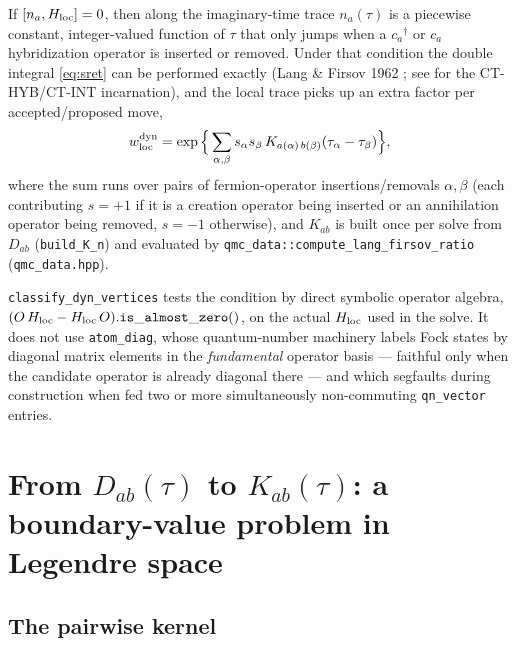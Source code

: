 \documentclass[a4paper,12pt]{article}
\renewcommand{\t}{\ensuremath{\tau}}
\newcommand{\Hloc}{\ensuremath{H_{\rm loc}}}
\newcommand{\ndag}{\ensuremath{^\dagger}}
\begin{document}
If $[n_a,\Hloc]=0$, then along the imaginary-time trace $n_a(\t)$ is a piecewise
constant, integer-valued function of $\t$ that only jumps when a $c_a\ndag$ or $c_a$
hybridization operator is inserted or removed. Under that condition the double
integral \eqref{eq:sret} can be performed exactly (Lang \& Firsov 1962
\cite{LangFirsov1962}; see \cite{WernerMillis2007,WernerMillis2010,GullRMP2011} for the
CT-HYB/CT-INT incarnation), and the local trace picks up an extra factor
per accepted/proposed move,
\begin{equation}
  w^{\rm dyn}_{\rm loc} = \exp\Big\{ \sum_{\alpha,\beta} s_\alpha s_\beta\,
  K_{a(\alpha)\,b(\beta)}(\t_\alpha-\t_\beta) \Big\},
  \label{eq:ratio}
\end{equation}
where the sum runs over pairs of fermion-operator insertions/removals $\alpha,\beta$
(each contributing $s=+1$ if it is a creation operator being inserted or an
annihilation operator being removed, $s=-1$ otherwise), and $K_{ab}$ is built once per
solve from $D_{ab}$ (\texttt{build\_K\_n}) and evaluated by
\texttt{qmc\_data::compute\_lang\_firsov\_ratio} (\texttt{qmc\_data.hpp}).

\texttt{classify\_dyn\_vertices} tests the condition by direct symbolic operator algebra,
$(O\,\Hloc-\Hloc\,O).\mathtt{is\_almost\_zero()}$, on the actual $\Hloc$ used in the
solve. It does not use \texttt{atom\_diag}, whose quantum-number machinery labels Fock
states by diagonal matrix elements in the \emph{fundamental} operator basis --- faithful
only when the candidate operator is already diagonal there --- and which segfaults during
construction when fed two or more simultaneously non-commuting \texttt{qn\_vector}
entries.

\section{From $D_{ab}(\t)$ to $K_{ab}(\t)$: a boundary-value problem in Legendre space}
\label{sec:shift}

\subsection{The pairwise kernel}
\end{document}
